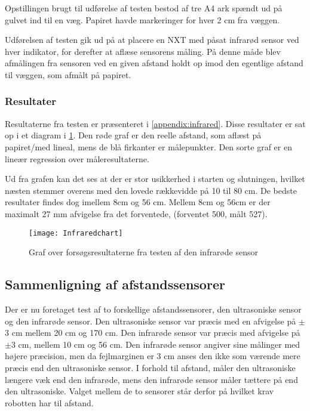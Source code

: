 Opstillingen brugt til udførelse af testen bestod af tre A4 ark spændt ud på gulvet ind til en væg. 
Papiret havde markeringer for hver 2 cm fra væggen.

Udførelsen af testen gik ud på at placere en NXT med påsat infrarød sensor ved hver indikator, for derefter at aflæse sensorens måling.
På denne måde blev afmålingen fra sensoren ved en given afstand holdt op imod den egentlige afstand til væggen, som afmålt på papiret.

\subsubsection{Resultater}

Resultaterne fra testen er præsenteret i \cref{appendix:infrared}. 
Disse resultater er sat op i et diagram i \cref{sensor:infrared_chart}.
Den røde graf er den reelle afstand, som aflæst på papiret/med lineal, mens de blå firkanter er målepunkter.
Den sorte graf er en lineær regression over måleresultaterne.

Ud fra grafen kan det ses at der er stor usikkerhed i starten og slutningen, hvilket næsten stemmer overens med den lovede rækkevidde på 10 til 80 cm.
De bedste resultater findes dog imellem 8cm og 56 cm. 
Mellem 8cm og 56cm er der maximalt 27 mm afvigelse fra det forventede, (forventet 500, målt 527).

\begin{figure}[h]
\texttt{[image: Infraredchart]}
\caption{Graf over forsøgsresultaterne fra testen af den infrarøde sensor}
\label{sensor:infrared_chart}
\end{figure}

\subsection{Sammenligning af afstandssensorer}

Der er nu foretaget test af to forskellige afstandssensorer, den ultrasoniske sensor og den infrarøde sensor. 
Den ultrasoniske sensor var præcis med en afvigelse på $\pm$3 cm mellem 20 cm og 170 cm.
Den infrarøde sensor var præcis med afvigelse på $\pm$3 cm, mellem 10 cm og 56 cm.
Den infrarøde sensor angiver sine målinger med højere præcision, men da fejlmarginen er 3 cm anses den ikke som værende mere præcis end den ultrasoniske sensor.
I forhold til afstand, måler den ultrasoniske længere væk end den infrarøde, mens den infrarøde sensor måler tættere på end den ultrasoniske.
Valget mellem de to sensorer står derfor på hvilket krav robotten har til afstand.

